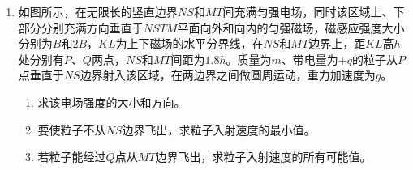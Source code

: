\begin{enumerate}[leftmargin=0em]
\begin{enumerate}
\end{enumerate}
\begin{figure}[h!]
\flushright

\end{figure}





\newpage
\item
{}
如图所示，在无限长的竖直边界$ NS $和$ MT $间充满匀强电场，同时该区域上、下部分分别充满方向垂直于$ NSTM $平面向外和向内的匀强磁场，磁感应强度大小分别为$ B $和$ 2B $，$ KL $为上下磁场的水平分界线，在$ NS $和$ MT $边界上，距$ KL $高$ h $处分别有$ P $、$ Q $两点，$ NS $和$ MT $间距为$ 1.8h $。质量为$ m $、带电量为$ +q $的粒子从$ P $点垂直于$ NS $边界射入该区域，在两边界之间做圆周运动，重力加速度为$ g $。
\begin{enumerate}
\renewcommand{\labelenumi}{\arabic{enumi}.}
\item
求该电场强度的大小和方向。
\item 
要使粒子不从$ NS $边界飞出，求粒子入射速度的最小值。
\item 
若粒子能经过$ Q $点从$ MT $边界飞出，求粒子入射速度的所有可能值。



\end{enumerate}
\begin{figure}[h!]
\flushright

\end{figure}



\end{enumerate}
